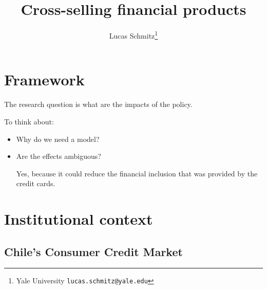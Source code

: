 \documentclass[12pt]{article}
\theoremstyle{plain}
\theoremstyle{plain}
\begin{document}


{\makeatletter
\renewcommand{\@maketitle}{%
  \vspace*{-1cm}%
  \begin{center}%
    {\Large \@title \par}%
    \vskip 1em%
    {\normalsize \@author \par}%
  \end{center}%
  \par
  \vskip 1em}
\makeatother

\title{Cross-selling financial products}
\author{Lucas Schmitz\thanks{Yale University \texttt{lucas.schmitz@yale.edu}}}
\date{}
\maketitle
}

\section{Framework}

The research question is what are the impacts of the policy. 

To think about: 
\begin{itemize}
  \item Why do we need a model? 
  \item Are the effects ambiguous?
  
  Yes, because it could reduce the financial inclusion that was provided by the credit cards. 
\end{itemize}


\section{Institutional context}
\label{sec:institutional}

\subsection{Chile's Consumer Credit Market}
\end{document}

